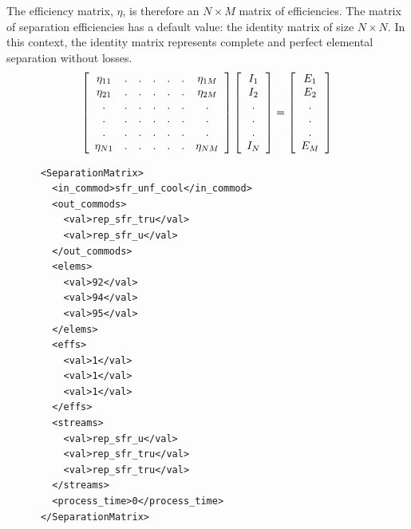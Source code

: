 \begin{frame}[fragile]
The efficiency matrix, $\eta$, is therefore an $N\times M$ matrix of
efficiencies. The matrix of separation efficiencies has a default value: the
identity matrix of size $N\times N$. In this context, the identity matrix
represents complete and perfect elemental separation without losses. 
\begin{align*}
  \left[
    \begin{array}{c c c c c c c}
      \eta_{11} & . & . & . & . & . & \eta_{1M} \\
      \eta_{21} & . & . & . & . & . & \eta_{2M} \\
      . & . & . & . & . & . & . \\
      . & . & . & . & . & . & . \\
      . & . & . & . & . & . & . \\
      \eta_{N1} & .  & . & . & . & . & \eta_{NM} \\
    \end{array}
    \right]
  \left[
    \begin{array}{c}
      I_1\\
      I_2\\
      . \\
      . \\
      . \\
      I_N\\
    \end{array}
    \right]
    =
    \left[
      \begin{array}{ c }
        E_1\\
        E_2\\
        .\\
        .\\
        .\\
        E_M\\
      \end{array}
      \right]
\end{align*}
\end{frame}

\begin{frame}[fragile]
\footnotesize{
\begin{lstlisting}
      <SeparationMatrix>
        <in_commod>sfr_unf_cool</in_commod>
        <out_commods>
          <val>rep_sfr_tru</val>
          <val>rep_sfr_u</val>
        </out_commods>
        <elems>
          <val>92</val>
          <val>94</val>
          <val>95</val>
        </elems>
        <effs>
          <val>1</val>
          <val>1</val>
          <val>1</val>
        </effs>
        <streams>
          <val>rep_sfr_u</val>
          <val>rep_sfr_tru</val>
          <val>rep_sfr_tru</val>
        </streams>
        <process_time>0</process_time>
      </SeparationMatrix>
  \end{lstlisting}
}
\end{frame}
